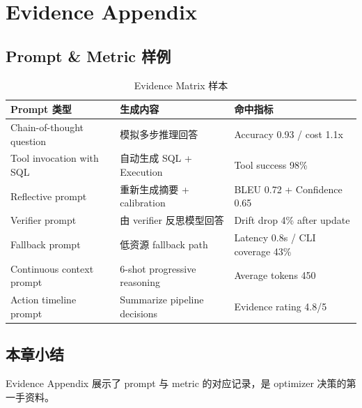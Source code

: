 \section{Evidence Appendix}

\subsection{Prompt \& Metric 样例}

\begin{table}[H]
\centering
\caption{Evidence Matrix 样本}
\begin{tabular}{p{}p{}p{}}
\toprule
Prompt 类型 & 生成内容 & 命中指标 \\
\midrule
Chain-of-thought question & 模拟多步推理回答 & Accuracy 0.93 / cost 1.1x \\
Tool invocation with SQL & 自动生成 SQL + Execution & Tool success 98\% \\
Reflective prompt & 重新生成摘要 + calibration & BLEU 0.72 + Confidence 0.65 \\
Verifier prompt & 由 verifier 反思模型回答 & Drift drop 4\% after update \\
Fallback prompt & 低资源 fallback path & Latency 0.8s / CLI coverage 43\% \\
Continuous context prompt & 6-shot progressive reasoning & Average tokens 450 \\
Action timeline prompt & Summarize pipeline decisions & Evidence rating 4.8/5 \\
\bottomrule
\end{tabular}
\end{table}

\subsection{本章小结}

Evidence Appendix 展示了 prompt 与 metric 的对应记录，是 optimizer 决策的第一手资料。

